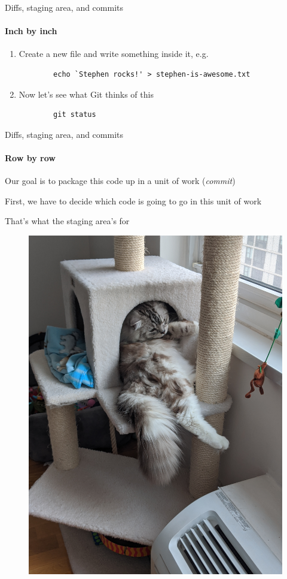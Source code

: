 \documentclass[pdf]{beamer} %
\begin{document}
\begin{frame}[fragile]{Diffs, staging area, and commits}
    \framesubtitle{Inch by inch}
    \begin{enumerate}
        \item Create a new file and write something inside it, e.g.
		\begin{verbatim}
        echo `Stephen rocks!' > stephen-is-awesome.txt
		\end{verbatim}
        \item Now let's see what Git thinks of this
		\begin{verbatim}
        git status
		\end{verbatim}
    \end{enumerate}
\end{frame}

\begin{frame}{Diffs, staging area, and commits}
    \framesubtitle{Row by row}
    Our goal is to package this code up in a unit of work (\emph{commit})

    \bigskip
    First, we have to decide which code is going to go in this unit of work

    \bigskip
    That's what the staging area's for

    \begin{figure}[htpb]
        \centering
        \includegraphics[width=0.5\linewidth]{fig/mowgli-2}
        \label{fig:fig/mowgli-2}
    \end{figure}
\end{frame}
\end{document}
